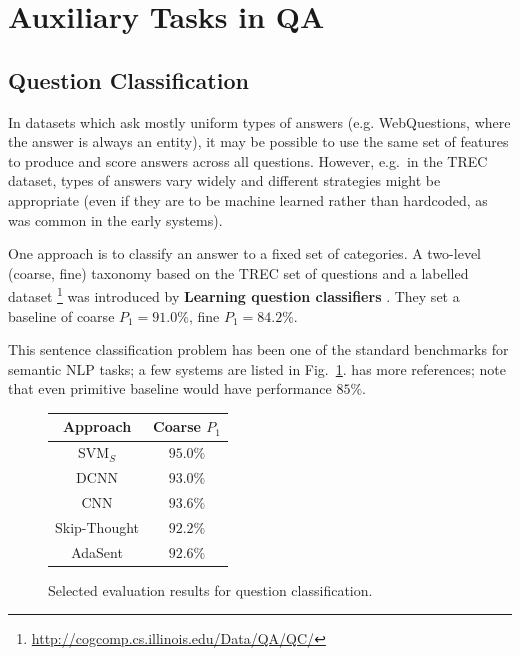 \section{Auxiliary Tasks in QA}

\subsection{Question Classification}

In datasets which ask mostly uniform types of answers (e.g. WebQuestions,
where the answer is always an entity), it may be possible to use the same
set of features to produce and score answers across all questions.
However, e.g.\ in the TREC dataset, types of answers vary widely and
different strategies might be appropriate (even if they are to be machine
learned rather than hardcoded, as was common in the early systems).

One approach is to classify an answer to a fixed set of categories.
A two-level (coarse, fine) taxonomy based on the TREC set of questions and a labelled dataset%
\footnote{\url{http://cogcomp.cs.illinois.edu/Data/QA/QC/}}
was introduced by \textbf{Learning question classifiers} \citep{QCLearning}.
They set a baseline of coarse $P_1=91.0\%$, fine $P_1=84.2\%$.

This sentence classification problem has been one of the standard benchmarks
for semantic NLP tasks; a few systems are listed in Fig.~\ref{fig:qcbench}.
\citep{AdaSent} has more references; note that even primitive baseline would have performance $85\%$.


\begin{figure}[t]
\centering
\begin{tabular}{|c|c|}
\hline
Approach & Coarse $P_1$ \\
\hline
SVM$_S$ \citep{QCSilvaSVM} & $95.0\%$ \\
DCNN \citep{QtcDCNN} & $93.0\%$ \\
CNN \citep{CNNSentClass} & $93.6\%$ \\
Skip-Thought \citep{SkipThought} & $92.2\%$ \\ %
AdaSent \citep{AdaSent} & $92.6\%$ \\
\hline
\end{tabular}
\vspace*{-0.2cm}
\caption{Selected evaluation results for question classification.}
\label{fig:qcbench}
\end{figure}


